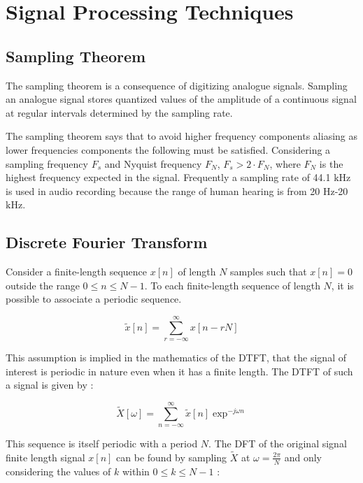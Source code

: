 \section{Signal Processing Techniques}
\subsection{Sampling Theorem}

The sampling theorem is a consequence of digitizing analogue signals. Sampling
an analogue signal stores quantized values of the amplitude of a continuous
signal at regular intervals determined by the sampling rate.

The sampling theorem says that to avoid higher frequency components aliasing as
lower frequencies components the following must be satisfied. Considering a
sampling frequency $F_{s}$ and Nyquist frequency $F_{N}$, $F_{s} > 2\cdot F_{N}$,
where $F_{N}$ is the highest frequency expected in the signal. Frequently a sampling
rate of 44.1 $\si{\kilo\hertz}$ is used in audio recording because the range of
human hearing is from 20 $\si{\hertz}$-20 $\si{\kilo\hertz}$.

\subsection{Discrete Fourier Transform}

Consider a finite-length sequence $x[n]$ of length $N$ samples such that $x[n] =
  0$ outside the range $0 \leq  n \leq N - 1$. To each finite-length sequence of
length $N$, it is possible to associate a periodic sequence.

\begin{equation}
  \tilde{x}[n] =\sum_{r=-\infty}^{\infty} x[n-r N]
\end{equation}

This assumption is implied in the mathematics of the \ac{DTFT}, that the signal of interest is
periodic in nature even when it has a finite length. The \ac{DTFT} of such a signal is given by :

\begin{equation}
  \tilde{X}[\omega] =\sum_{n=-\infty}^{\infty} \tilde{x}[n] \exp^{-j \omega n }
\end{equation}

This sequence is itself periodic with a period $N$. The \ac{DFT} of the original signal finite length signal $x[n]$ can be found
by sampling $\tilde{X}$ at $\omega=\frac{2 \pi}{N}$ and only considering the
values of $k$ within $0 \leq  k \leq N - 1$ :

